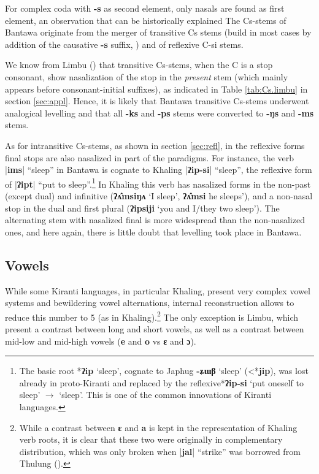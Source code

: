 \documentclass[oldfontcommands,oneside,a4paper,11pt]{article}
\newcommand{\ipa}[1]{\textbf{{\phon\mbox{#1}}}} %
\newcommand{\dhatu}[2]{|\ipa{#1}| ``#2''}
\begin{document}
For complex coda with \ipa{-s} as second element, only nasals are found as first element, an observation that can be historically explained The Cs-stems of Bantawa originate from the merger of transitive Cs stems (build in most cases by addition of the causative \ipa{-s} suffix, \citealt{michailovsky85dental}) and of reflexive C-si stems. 

We know from Limbu (\citealt[xiii]{michailovsky02dico}) that transitive Cs-stems, when the C is a stop consonant, show nasalization of the stop in the \textit{present} stem (which mainly appears before consonant-initial suffixes), as indicated in Table \ref{tab:Cs.limbu} in section \ref{sec:appl}. Hence, it is likely that Bantawa transitive Cs-stems underwent analogical levelling and that all \ipa{-ks} and \ipa{-ps} stems were converted to \ipa{-ŋs} and \ipa{-ms} stems.

As for intransitive Cs-stems, as shown in section \ref{sec:refl}, in the reflexive forms final stops are also nasalized in part of the paradigms. For instance, the verb \dhatu{ims}{sleep} in Bantawa is cognate to Khaling \dhatu{ʔip-si}{sleep}, the reflexive form of \dhatu{ʔipt}{put to sleep}.\footnote{The basic root *\ipa{ʔip} `sleep', cognate to Japhug \ipa{-ʑɯβ} `sleep' (<*\ipa{jip}), was lost already in proto-Kiranti and replaced by the reflexive*\ipa{ʔip-si} `put oneself to sleep' $\rightarrow$ `sleep'. This is one of the common innovations of Kiranti languages.} In Khaling this verb has nasalized forms in the non-past (except dual) and infinitive (\ipa{ʔʌ̂msiŋʌ} `I sleep', \ipa{ʔʌ̂msi} he sleeps'), and a non-nasal stop in the dual and first plural (\ipa{ʔipsiji} `you and I/they two sleep'). The alternating stem with nasalized final is more widespread than the non-nasalized ones, and here again, there is little doubt that levelling took place in Bantawa.

\subsection{Vowels} \label{sec:vowels}

While some Kiranti languages, in particular Khaling, present very complex vowel systems and bewildering vowel alternations, internal reconstruction allows to reduce this number to 5 (as in Khaling).\footnote{While a contrast between \ipa{ɛ} and \ipa{a} is kept in the representation of Khaling verb roots, it is clear that these two were originally in complementary distribution, which was only broken when \dhatu{jal}{strike} was borrowed from Thulung (\citealt[1110]{jacques12khaling}).} The only exception is Limbu, which present a contrast between long and short vowels, as well as a contrast between mid-low and mid-high vowels (\ipa{e} and \ipa{o} vs \ipa{ɛ} and \ipa{ɔ}).  
\end{document}
